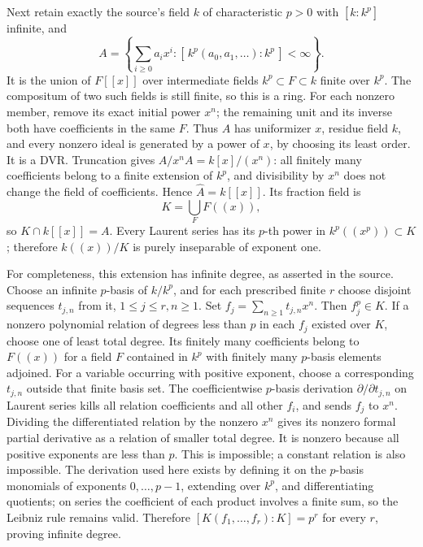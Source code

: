 Next retain exactly the source's field \(k\) of characteristic \(p>0\) with \([k:k^p]\) infinite, and \[
 A=\left\{\sum_{i\ge0}a_i x^i:
       [\,k^p(a_0,a_1,\ldots):k^p\,]<\infty\right\}.
\] It is the union of \(F[[x]]\) over intermediate fields \(k^p\subset F\subset k\) finite over \(k^p\). The compositum of two such fields is still finite, so this is a ring. For each nonzero member, remove its exact initial power \(x^n\); the remaining unit and its inverse both have coefficients in the same \(F\). Thus \(A\) has uniformizer \(x\), residue field \(k\), and every nonzero ideal is generated by a power of \(x\), by choosing its least order. It is a DVR. Truncation gives \(A/x^nA=k[x]/(x^n)\): all finitely many coefficients belong to a finite extension of \(k^p\), and divisibility by \(x^n\) does not change the field of coefficients. Hence \(\widehat A=k[[x]]\). Its fraction field is \[
 K=\bigcup_F F((x)),
\] so \(K\cap k[[x]]=A\). Every Laurent series has its \(p\)-th power in \(k^p((x^p))\subset K\); therefore \(k((x))/K\) is purely inseparable of exponent one.

For completeness, this extension has infinite degree, as asserted in the source. Choose an infinite \(p\)-basis of \(k/k^p\), and for each prescribed finite \(r\) choose disjoint sequences \(t_{j,n}\) from it, \(1\le j\le r,n\ge1\). Set \(f_j=\sum_{n\ge1}t_{j,n}x^n\). Then \(f_j^p\in K\). If a nonzero polynomial relation of degrees less than \(p\) in each \(f_j\) existed over \(K\), choose one of least total degree. Its finitely many coefficients belong to \(F((x))\) for a field \(F\) contained in \(k^p\) with finitely many \(p\)-basis elements adjoined. For a variable occurring with positive exponent, choose a corresponding \(t_{j,n}\) outside that finite basis set. The coefficientwise \(p\)-basis derivation \(\partial/\partial t_{j,n}\) on Laurent series kills all relation coefficients and all other \(f_i\), and sends \(f_j\) to \(x^n\). Dividing the differentiated relation by the nonzero \(x^n\) gives its nonzero formal partial derivative as a relation of smaller total degree. It is nonzero because all positive exponents are less than \(p\). This is impossible; a constant relation is also impossible. The derivation used here exists by defining it on the \(p\)-basis monomials of exponents \(0,\ldots,p-1\), extending over \(k^p\), and differentiating quotients; on series the coefficient of each product involves a finite sum, so the Leibniz rule remains valid. Therefore \([K(f_1,\ldots,f_r):K]=p^r\) for every \(r\), proving infinite degree.

